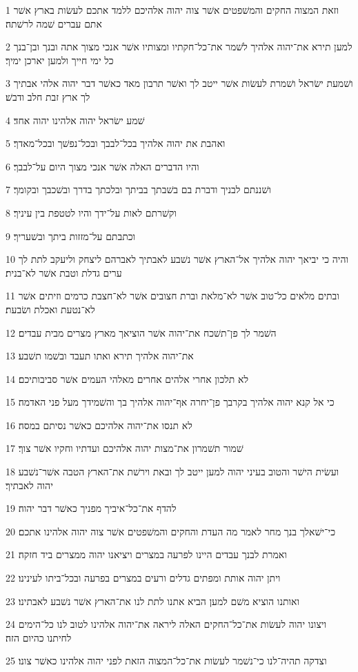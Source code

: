 \par 1 וזאת המצוה החקים והמשׁפטים אשׁר צוה יהוה אלהיכם ללמד אתכם לעשׂות בארץ אשׁר אתם עברים שׁמה לרשׁתה׃
\par 2 למען תירא את־יהוה אלהיך לשׁמר את־כל־חקתיו ומצותיו אשׁר אנכי מצוך אתה ובנך ובן־בנך כל ימי חייך ולמען יארכן ימיך׃
\par 3 ושׁמעת ישׂראל ושׁמרת לעשׂות אשׁר ייטב לך ואשׁר תרבון מאד כאשׁר דבר יהוה אלהי אבתיך לך ארץ זבת חלב ודבשׁ׃
\par 4 שׁמע ישׂראל יהוה אלהינו יהוה אחד׃
\par 5 ואהבת את יהוה אלהיך בכל־לבבך ובכל־נפשׁך ובכל־מאדך׃
\par 6 והיו הדברים האלה אשׁר אנכי מצוך היום על־לבבך׃
\par 7 ושׁננתם לבניך ודברת בם בשׁבתך בביתך ובלכתך בדרך ובשׁכבך ובקומך׃
\par 8 וקשׁרתם לאות על־ידך והיו לטטפת בין עיניך׃
\par 9 וכתבתם על־מזזות ביתך ובשׁעריך׃
\par 10 והיה כי יביאך יהוה אלהיך אל־הארץ אשׁר נשׁבע לאבתיך לאברהם ליצחק וליעקב לתת לך ערים גדלת וטבת אשׁר לא־בנית׃
\par 11 ובתים מלאים כל־טוב אשׁר לא־מלאת וברת חצובים אשׁר לא־חצבת כרמים וזיתים אשׁר לא־נטעת ואכלת ושׂבעת׃
\par 12 השׁמר לך פן־תשׁכח את־יהוה אשׁר הוציאך מארץ מצרים מבית עבדים׃
\par 13 את־יהוה אלהיך תירא ואתו תעבד ובשׁמו תשׁבע׃
\par 14 לא תלכון אחרי אלהים אחרים מאלהי העמים אשׁר סביבותיכם׃
\par 15 כי אל קנא יהוה אלהיך בקרבך פן־יחרה אף־יהוה אלהיך בך והשׁמידך מעל פני האדמה׃
\par 16 לא תנסו את־יהוה אלהיכם כאשׁר נסיתם במסה׃
\par 17 שׁמור תשׁמרון את־מצות יהוה אלהיכם ועדתיו וחקיו אשׁר צוך׃
\par 18 ועשׂית הישׁר והטוב בעיני יהוה למען ייטב לך ובאת וירשׁת את־הארץ הטבה אשׁר־נשׁבע יהוה לאבתיך׃
\par 19 להדף את־כל־איביך מפניך כאשׁר דבר יהוה׃
\par 20 כי־ישׁאלך בנך מחר לאמר מה העדת והחקים והמשׁפטים אשׁר צוה יהוה אלהינו אתכם׃
\par 21 ואמרת לבנך עבדים היינו לפרעה במצרים ויציאנו יהוה ממצרים ביד חזקה׃
\par 22 ויתן יהוה אותת ומפתים גדלים ורעים במצרים בפרעה ובכל־ביתו לעינינו׃
\par 23 ואותנו הוציא משׁם למען הביא אתנו לתת לנו את־הארץ אשׁר נשׁבע לאבתינו׃
\par 24 ויצונו יהוה לעשׂות את־כל־החקים האלה ליראה את־יהוה אלהינו לטוב לנו כל־הימים לחיתנו כהיום הזה׃
\par 25 וצדקה תהיה־לנו כי־נשׁמר לעשׂות את־כל־המצוה הזאת לפני יהוה אלהינו כאשׁר צונו׃

